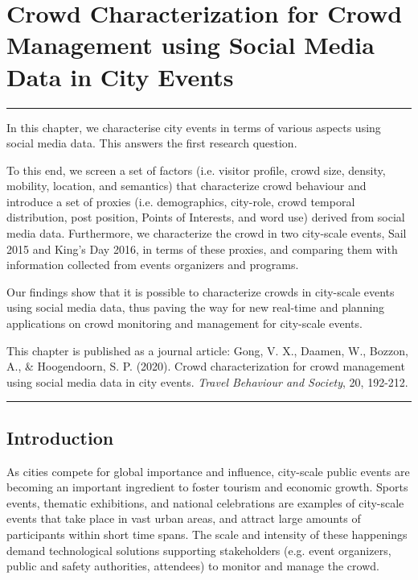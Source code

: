\chapter{Crowd Characterization for Crowd Management using Social Media Data in City Events}\label{ch2_title}

\noindent\rule{\textwidth}{1pt}

In this chapter, we characterise city events in terms of various aspects using social media data. This answers the first research question. 

To this end, we screen a set of factors (i.e. visitor profile, crowd size, density, mobility, location, and semantics) that characterize crowd behaviour and introduce a set of proxies (i.e. demographics, city-role, crowd temporal distribution, post position, Points of Interests, and word use) derived from social media data. Furthermore, we characterize the crowd in two city-scale events, Sail 2015 and King's Day 2016, in terms of these proxies, and comparing them with information collected from events organizers and programs.

Our findings show that it is possible to characterize crowds in city-scale events using social media data, thus paving the way for new real-time and planning applications on crowd monitoring and management for city-scale events.

This chapter is published as a journal article: Gong, V. X., Daamen, W., Bozzon, A., \& Hoogendoorn, S. P. (2020). Crowd characterization for crowd management using social media data in city events. \emph{Travel Behaviour and Society}, 20, 192-212.

\noindent\rule{\textwidth}{1pt}

\newpage


\vspace*{-10mm}
\section{Introduction}\label{ch2_2.1_introduction}

As cities compete for global importance and influence, city-scale public events are becoming an important ingredient to foster tourism and economic growth. Sports events, thematic exhibitions, and national celebrations are examples of city-scale events that take place in vast urban areas, and attract large amounts of participants within short time spans. The scale and intensity of these happenings demand technological solutions supporting stakeholders (e.g. event organizers, public and safety authorities, attendees) to monitor and manage the crowd.
